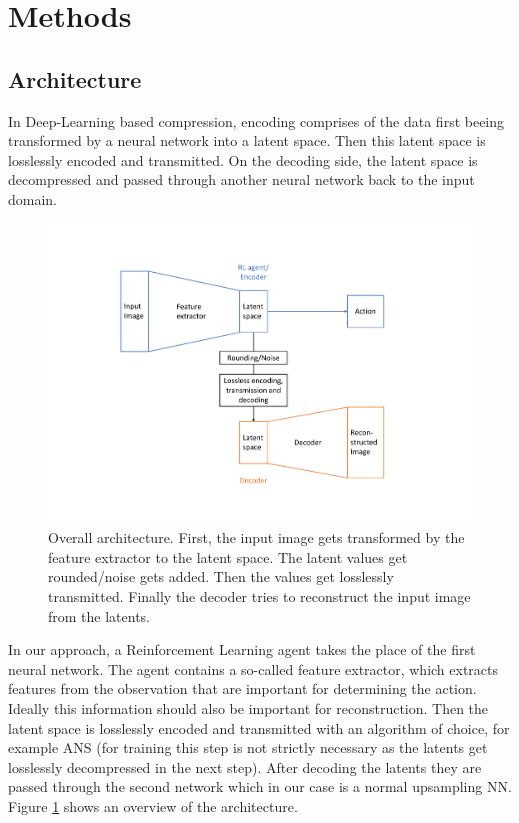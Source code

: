 \section{Methods}

\subsection{Architecture}\label{methods:Architecture}
    In Deep-Learning based compression, encoding comprises of the data first
    beeing transformed by a neural network into a latent space. Then this latent
    space is losslessly encoded and transmitted. On the decoding side, the
    latent space is decompressed and passed through another neural network back
    to the input domain.

    \begin{figure}[H]
        \centering
        \includegraphics[width=0.8\linewidth]{images/architecture.pdf}
        \caption{Overall architecture. First, the input image gets transformed by the feature extractor to the latent space. The latent values get rounded/noise gets added. Then the values get losslessly transmitted. Finally the decoder tries to reconstruct the input image from the latents.}
        \label{fig:Architecture}
    \end{figure}

    In our approach, a Reinforcement Learning agent takes the place of the first
    neural network. The agent contains a so-called feature extractor, which
    extracts features from the observation that are important for determining
    the action. Ideally this information should also be important
    for reconstruction. Then the latent space is losslessly encoded and
    transmitted with an algorithm of choice, for example ANS (for training this
    step is not strictly necessary as the latents get losslessly decompressed in
    the next step). After decoding the latents they are passed through the
    second network which in our case is a normal upsampling NN.
    Figure \ref{fig:Architecture} shows an overview of the architecture.

